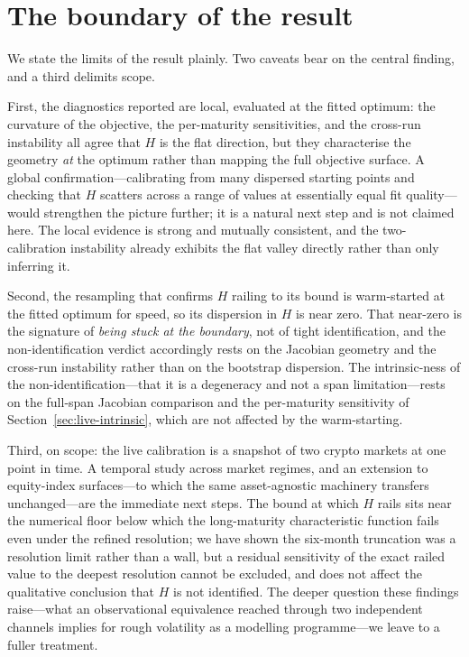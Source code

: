 \documentclass[namedate,webpdf]{ima-authoring-template}
\numberwithin{equation}{section}
\begin{document}
\section{The boundary of the result}\label{sec:limitations}

We state the limits of the result plainly. Two caveats bear on the central finding, and a third
delimits scope.

First, the diagnostics reported are local, evaluated at the fitted optimum: the curvature of the
objective, the per-maturity sensitivities, and the cross-run instability all agree that $H$ is the
flat direction, but they characterise the geometry \emph{at} the optimum rather than mapping the full
objective surface. A global confirmation---calibrating from many dispersed starting points and
checking that $H$ scatters across a range of values at essentially equal fit quality---would
strengthen the picture further; it is a natural next step and is not claimed here. The local evidence
is strong and mutually consistent, and the two-calibration instability already exhibits the flat
valley directly rather than only inferring it.

Second, the resampling that confirms $H$ railing to its bound is warm-started at the fitted optimum for
speed, so its dispersion in $H$ is near zero. That near-zero is the signature of \emph{being stuck at
the boundary}, not of tight identification, and the non-identification verdict accordingly rests on the
Jacobian geometry and the cross-run instability rather than on the bootstrap dispersion. The
intrinsic-ness of the non-identification---that it is a degeneracy and not a span limitation---rests on
the full-span Jacobian comparison and the per-maturity sensitivity of Section~\ref{sec:live-intrinsic},
which are not affected by the warm-starting.

Third, on scope: the live calibration is a snapshot of two crypto markets at one point in time. A
temporal study across market regimes, and an extension to equity-index surfaces---to which the same
asset-agnostic machinery transfers unchanged---are the immediate next steps. The bound at which $H$
rails sits near the numerical floor below which the long-maturity characteristic function fails even
under the refined resolution; we have shown the six-month truncation was a resolution limit rather than
a wall, but a residual sensitivity of the exact railed value to the deepest resolution cannot be
excluded, and does not affect the qualitative conclusion that $H$ is not identified. The deeper
question these findings raise---what an observational equivalence reached through two independent
channels implies for rough volatility as a modelling programme---we leave to a fuller treatment.
\end{document}
